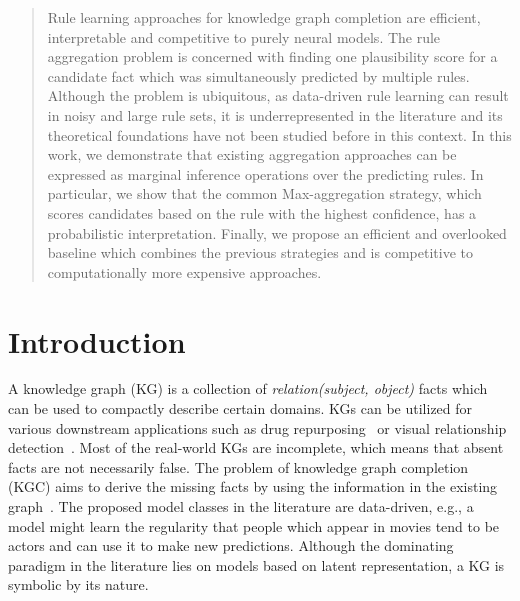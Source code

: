 \documentclass{article}
\theoremstyle{plain}
\theoremstyle{remark}
\newcommand{\allatomrules}{\Tilde{\mathcal{C}}}
\begin{document}
\begin{abstract}
Rule learning approaches for knowledge graph completion are efficient, interpretable and  competitive to purely neural models. The rule aggregation problem is concerned with finding one plausibility score for a candidate fact which was simultaneously predicted by multiple rules. Although the problem is ubiquitous, as data-driven rule learning can result in noisy and large rule sets, it is underrepresented in the literature and its theoretical foundations have not been studied before in this context. In this work, we demonstrate that existing aggregation approaches can be expressed as  marginal inference operations over the predicting rules. In particular, we show that the common Max-aggregation strategy, which scores candidates based on the rule with the highest confidence, has a probabilistic interpretation. Finally, we propose an efficient and overlooked baseline which combines the previous strategies and is competitive to computationally more expensive approaches.
\end{abstract}


\section{Introduction}



A knowledge graph (KG) is a collection of \textit{relation(subject, object)} facts which can be used to compactly describe certain domains. KGs can be utilized for various downstream applications such as drug repurposing~\cite{hetioliu2021neural} or visual relationship detection~\cite{Baier2017ImprovingVR}. Most of the real-world KGs are incomplete, which means that absent facts are not necessarily false. The problem of knowledge graph completion (KGC) aims to derive the missing facts by using the information in the existing graph~\cite{ruffinelli2020dog,rossi2020knowledge}. The proposed model classes in the literature are data-driven, e.g., a model might learn the regularity that people which appear in movies tend to be actors and can use it to make new predictions. Although the dominating paradigm in the literature lies on models based on latent representation, a KG is symbolic by its nature.
\end{document}
